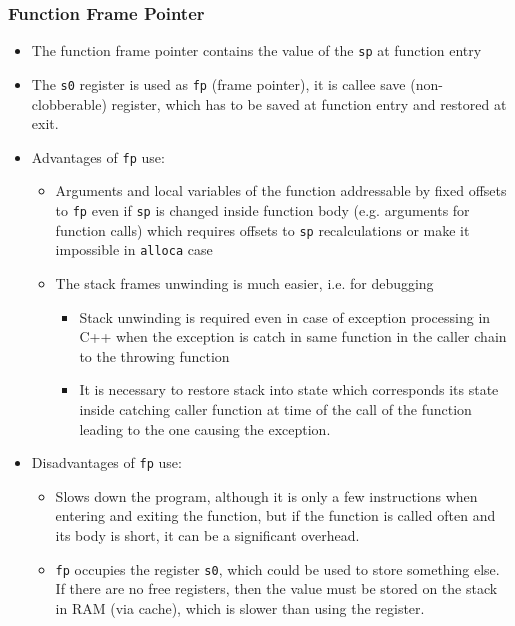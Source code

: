 \documentclass{beamer}
\begin{document}
\begin{frame}[shrink=5]
\frametitle{Function Frame Pointer}

\begin{itemize}
 \item The function frame pointer contains the value of the \texttt{sp} at function entry
 \item The \texttt{s0} register is used as \texttt{fp} (frame pointer), it is callee save (non-clobberable) register, which has to be saved at function entry and restored at exit.
 \item Advantages of \texttt{fp} use:
\begin{itemize}
 \item Arguments and local variables of the function addressable by fixed offsets to \texttt{fp} even if \texttt{sp} is changed inside function body (e.g. arguments for function calls) which requires offsets to \texttt{sp} recalculations or make it impossible in \texttt{alloca} case
 \item The stack frames unwinding is much easier, i.e. for debugging
\begin{itemize}
 \item Stack unwinding is required even in case of exception processing in C++ when the exception is catch in same function in the caller chain to the throwing function
 \item It is necessary to restore stack into state which corresponds its state inside catching caller function at time of the call of the function leading to the one causing the exception.
\end{itemize}
\end{itemize}
 \item Disadvantages of \texttt{fp} use:
\begin{itemize}
\item Slows down the program, although it is only a few instructions when entering and exiting the function, but if the function is called often and its body is short, it can be a significant overhead.
\item \texttt{fp} occupies the register \texttt{s0}, which could be used to store something else. If there are no free registers, then the value must be stored on the stack in RAM (via cache), which is slower than using the register.
\end{itemize}
\end{itemize}
\end{frame}
\end{document}

